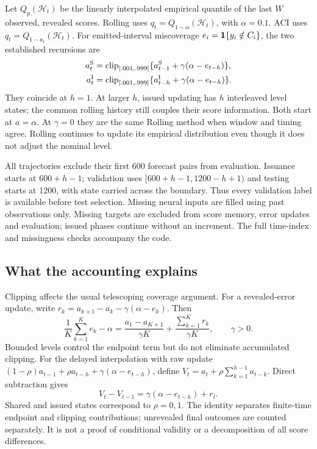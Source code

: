 Let $Q_p(\mathcal H_t)$ be the linearly interpolated empirical quantile of the last
$W$ observed, revealed scores. Rolling uses $q_t=Q_{1-\alpha}(\mathcal H_t)$, with
$\alpha=0.1$. ACI uses $q_t=Q_{1-a_t}(\mathcal H_t)$. For emitted-interval
miscoverage $e_i=\mathbf{1}\{y_i\notin C_i\}$, the two established recursions are
\begin{align}
a_t^{\rm S}&=\operatorname{clip}_{[.001,.999]}\{a_{t-1}^{\rm S}+\gamma(\alpha-e_{t-h})\},\label{eq:shared}\\
a_t^{\rm I}&=\operatorname{clip}_{[.001,.999]}\{a_{t-h}^{\rm I}+\gamma(\alpha-e_{t-h})\}.\label{eq:issued}
\end{align}
They coincide at $h=1$. At larger $h$, issued updating has $h$ interleaved level
states; the common rolling history still couples their score information.
Both start at $a=\alpha$. At $\gamma=0$ they are the same Rolling method when
window and timing agree. Rolling continues to update its empirical distribution
even though it does not adjust the nominal level.

All trajectories exclude their first 600 forecast pairs from evaluation. Issuance
starts at $600+h-1$; validation uses $[600+h-1,1200-h+1)$ and testing starts at
1200, with state carried across the boundary. Thus every validation label is
available before test selection. Missing neural inputs are filled using past
observations only. Missing targets are excluded from score memory, error updates
and evaluation; issued phases continue without an increment. The full time-index
and missingness checks accompany the code.

\subsection{What the accounting explains}\label{sec:topology}
Clipping affects the usual telescoping coverage argument. For a revealed-error
update, write $r_k=a_{k+1}-a_k-\gamma(\alpha-e_k)$. Then
\begin{equation}\label{eq:identity}
\frac{1}{K}\sum_{k=1}^{K}e_k-\alpha
=\frac{a_1-a_{K+1}}{\gamma K}+\frac{\sum_{k=1}^{K}r_k}{\gamma K},\qquad\gamma>0.
\end{equation}
Bounded levels control the endpoint term but do not eliminate accumulated clipping.
For the delayed interpolation with raw update
$(1-\rho)a_{t-1}+\rho a_{t-h}+\gamma(\alpha-e_{t-h})$, define
$V_t=a_t+\rho\sum_{k=1}^{h-1}a_{t-k}$. Direct subtraction gives
\begin{equation}\label{eq:potential}
V_t-V_{t-1}=\gamma(\alpha-e_{t-h})+r_t.
\end{equation}
Shared and issued states correspond to $\rho=0,1$. The identity separates finite-time
endpoint and clipping contributions; unrevealed final outcomes are counted separately.
It is not a proof of conditional validity or a decomposition of all score differences.

